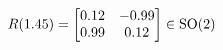 \documentclass[preview]{standalone}
\begin{document}
\begin{align*}
\special{dvisvgm:raw <g id='unique000'>}R(1.45) = \begin{bmatrix} 0.12 & -0.99 \\ 0.99 & 0.12 \end{bmatrix} \in \text{SO}(2)\special{dvisvgm:raw </g>}
\end{align*}
\end{document}
